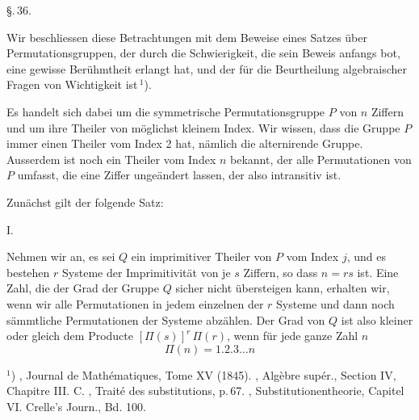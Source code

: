 \begin{center}
\S.\,36.

\end{center}

Wir beschliessen diese Betrachtungen mit dem Beweise eines
Satzes über Permutationsgruppen, der durch die Schwierigkeit,
die sein Beweis anfangs bot, eine gewisse Berühmtheit erlangt
hat, und der für die Beurtheilung algebraischer Fragen von
Wichtigkeit ist\,$^{1}$).

Es handelt sich dabei um die symmetrische Permutationsgruppe
 $P$ von $n$ Ziffern und um ihre Theiler von möglichst
kleinem Index. Wir wissen, dass die Gruppe $P$ immer einen
Theiler vom Index 2 hat, nämlich die alternirende Gruppe.
Ausserdem ist noch ein Theiler vom Index $n$ bekannt, der alle
Permutationen von $P$ umfasst, die eine Ziffer ungeändert lassen,
der also intransitiv ist.

Zunächst gilt der folgende Satz:

I. 

Nehmen wir an, es sei $Q$ ein imprimitiver Theiler von $P$
vom Index $j$, und es bestehen $r$ Systeme der Imprimitivität von
je $s$ Ziffern, so dass $n = rs$ ist. Eine Zahl, die der Grad der
Gruppe $Q$ sicher nicht übersteigen kann, erhalten wir, wenn wir
alle Permutationen in jedem einzelnen der $r$ Systeme und dann
noch sämmtliche Permutationen der Systeme abzählen. Der Grad
von $Q$ ist also kleiner oder gleich dem Producte $[\Pi(s)]^r\,\Pi(r)$,
wenn für jede ganze Zahl $n$
\[
\Pi(n) = 1.2.3\dots n
\]

$^{1}$) , Journal de Mathématiques, Tome XV (1845). ,
Algèbre supér., Section IV, Chapitre III. C. , Traité des substitutions,
p.\,67. , Substitutionentheorie, Capitel VI. Crelle's Journ.,
Bd. 100.
